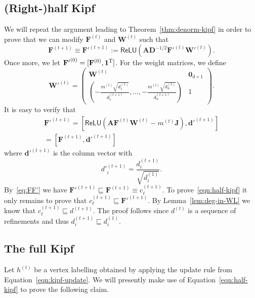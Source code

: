 \subsection{(Right-)half Kipf}
We will repeat the argument leading to Theorem~\ref{thm:denorm-kipf} in order
to prove that we can modify $\mathbf{F}^{(t)}$ and $\mathbf{W}^{(t)}$
such that
\begin{equation}\label{eqn:half-kipf}
    \mathbf{F}^{(t+1)} \equiv
    \mathbf{F'}^{(t+1)} :=
    \textsf{ReLU}\left(\mathbf{AD}^{-1/2}\mathbf{F'}^{(t)}\mathbf{W'}^{(t)}\right).
\end{equation}
Once more, we let $\mathbf{F'}^{(0)} = [\mathbf{F}^{(0)},
\mathbf{1}^\textsc{T}]$. For the weight matrices, we define
\[
    \mathbf{W'}^{(t)}=
    \begin{pmatrix}
        \mathbf{W}^{(t)} & \mathbf{0}_{d\times 1}\\
        \left(
            -\frac{m^{(t)}\sqrt{d_1^{(1)}}}{d_1^{(t+1)}},
            \ldots,
            -\frac{m^{(t)}\sqrt{d_n^{(1)}}}{d_n^{(t+1)}}
        \right) & 1
    \end{pmatrix}.
\]
It is easy to verify that
\begin{align}
    \mathbf{F'}^{(t+1)} = [\textsf{ReLU}(\mathbf{AF}^{(t)}\mathbf{W}^{(t)} - m^{(t)}\mathbf{J}),
    \mathbf{d'}^{(t+1)}] \nonumber \\
    = [\mathbf{F}^{(t+1)},\mathbf{d'}^{(t+1)}] \label{eq:FF'}
\end{align}
where $\mathbf{d'}^{(t+1)}$ is the column vector with
\[
    d'^{(t+1)}_i = \frac{d^{(t+1)}_i}{\sqrt{d^{(1)}_i}}.
\]
By~\eqref{eq:FF'} we have $\mathbf{F'}^{(t+1)} \sqsubseteq \mathbf{F}^{(t+1)} \equiv c_\ell^{(t+1)}$. To prove~\eqref{eqn:half-kipf} it only remains to prove that $c_\ell^{(t+1)} \sqsubseteq \mathbf{F'}^{(t+1)}$.
By Lemma~\ref{lem:deg-in-WL} we know that $c_\ell^{(t+1)} \sqsubseteq d^{(t+1)}$. The proof follows since $d^{(t)}$ is a sequence of refinements and thus $d^{(t+1)}_i \sqsubseteq d^{(1)}_i$.

\subsection{The full Kipf}
Let $h^{(t)}$ be a vertex labelling obtained by applying
the update rule from Equation~\eqref{eqn:kipf-update}. We will
presently 
make use of Equation~\eqref{eqn:half-kipf} to prove the following
claim.

